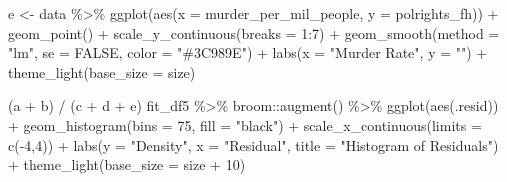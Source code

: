 \documentclass[
  english,
  man,floatsintext]{apa6}
\newenvironment{Shaded}{\begin{snugshade}}{\end{snugshade}}
\newcommand{\AttributeTok}[1]{\textcolor[rgb]{0.77,0.63,0.00}{#1}}
\newcommand{\ConstantTok}[1]{\textcolor[rgb]{0.00,0.00,0.00}{#1}}
\newcommand{\DecValTok}[1]{\textcolor[rgb]{0.00,0.00,0.81}{#1}}
\newcommand{\FunctionTok}[1]{\textcolor[rgb]{0.00,0.00,0.00}{#1}}
\newcommand{\NormalTok}[1]{#1}
\newcommand{\OtherTok}[1]{\textcolor[rgb]{0.56,0.35,0.01}{#1}}
\newcommand{\SpecialCharTok}[1]{\textcolor[rgb]{0.00,0.00,0.00}{#1}}
\newcommand{\StringTok}[1]{\textcolor[rgb]{0.31,0.60,0.02}{#1}}
\begin{document}
\begin{Shaded}
\begin{Highlighting}[]
\NormalTok{e }\OtherTok{\textless{}{-}}\NormalTok{ data }\SpecialCharTok{\%\textgreater{}\%} 
  \FunctionTok{ggplot}\NormalTok{(}\FunctionTok{aes}\NormalTok{(}\AttributeTok{x =}\NormalTok{ murder\_per\_mil\_people, }\AttributeTok{y =}\NormalTok{ polrights\_fh)) }\SpecialCharTok{+} 
  \FunctionTok{geom\_point}\NormalTok{() }\SpecialCharTok{+} 
  \FunctionTok{scale\_y\_continuous}\NormalTok{(}\AttributeTok{breaks =} \DecValTok{1}\SpecialCharTok{:}\DecValTok{7}\NormalTok{) }\SpecialCharTok{+} 
  \FunctionTok{geom\_smooth}\NormalTok{(}\AttributeTok{method =} \StringTok{"lm"}\NormalTok{, }\AttributeTok{se =} \ConstantTok{FALSE}\NormalTok{, }\AttributeTok{color =} \StringTok{"\#3C989E"}\NormalTok{) }\SpecialCharTok{+} 
  \FunctionTok{labs}\NormalTok{(}\AttributeTok{x =} \StringTok{"Murder Rate"}\NormalTok{, }\AttributeTok{y =} \StringTok{""}\NormalTok{) }\SpecialCharTok{+} \FunctionTok{theme\_light}\NormalTok{(}\AttributeTok{base\_size =}\NormalTok{ size)}

\NormalTok{(a }\SpecialCharTok{+}\NormalTok{ b) }\SpecialCharTok{/}\NormalTok{ (c }\SpecialCharTok{+}\NormalTok{ d }\SpecialCharTok{+}\NormalTok{ e) }
\NormalTok{fit\_df5 }\SpecialCharTok{\%\textgreater{}\%} 
\NormalTok{  broom}\SpecialCharTok{::}\FunctionTok{augment}\NormalTok{() }\SpecialCharTok{\%\textgreater{}\%} 
  \FunctionTok{ggplot}\NormalTok{(}\FunctionTok{aes}\NormalTok{(.resid)) }\SpecialCharTok{+} 
  \FunctionTok{geom\_histogram}\NormalTok{(}\AttributeTok{bins =} \DecValTok{75}\NormalTok{, }\AttributeTok{fill =} \StringTok{"black"}\NormalTok{) }\SpecialCharTok{+}
  \FunctionTok{scale\_x\_continuous}\NormalTok{(}\AttributeTok{limits =} \FunctionTok{c}\NormalTok{(}\SpecialCharTok{{-}}\DecValTok{4}\NormalTok{,}\DecValTok{4}\NormalTok{)) }\SpecialCharTok{+} 
  \FunctionTok{labs}\NormalTok{(}\AttributeTok{y =} \StringTok{"Density"}\NormalTok{, }\AttributeTok{x =} \StringTok{"Residual"}\NormalTok{, }\AttributeTok{title =} \StringTok{"Histogram of Residuals"}\NormalTok{) }\SpecialCharTok{+} 
  \FunctionTok{theme\_light}\NormalTok{(}\AttributeTok{base\_size =}\NormalTok{ size }\SpecialCharTok{+} \DecValTok{10}\NormalTok{)}



\end{Highlighting}
\end{Shaded}
\end{document}
